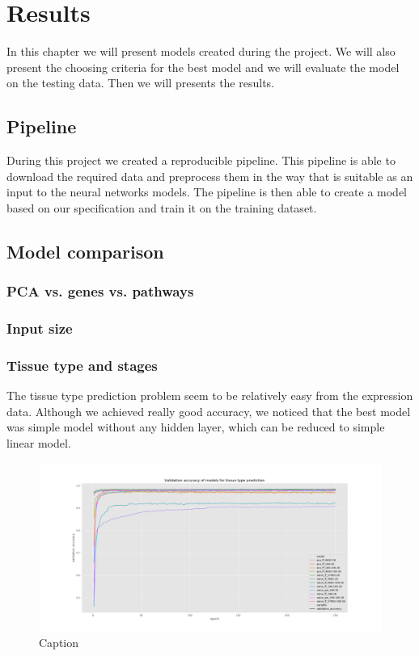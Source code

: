 \chapter{Results}
In this chapter we will present models created during the project.
We will also present the choosing criteria for the best model and we will evaluate the model on the testing data.
Then we will presents the results.

\section{Pipeline}
During this project we created a reproducible pipeline.
This pipeline is able to download the required data and preprocess them in the way that is suitable as an input to the neural networks models.
The pipeline is then able to create a model based on our specification and train it on the training dataset.

\section{Model comparison}

\subsection{PCA vs. genes vs. pathways}
\subsection{Input size}
\subsection{Tissue type and stages}
The tissue type prediction problem seem to be relatively easy from the expression data.
Although we achieved really good accuracy, we noticed that the best model was simple model without any hidden layer, which can be reduced to simple linear model.

\begin{figure}
    \centering
    \includegraphics[width=\linewidth]{images/val_acc_tt.png}
    \caption{Caption}
    \label{fig:val_acc_tt}
\end{figure}

